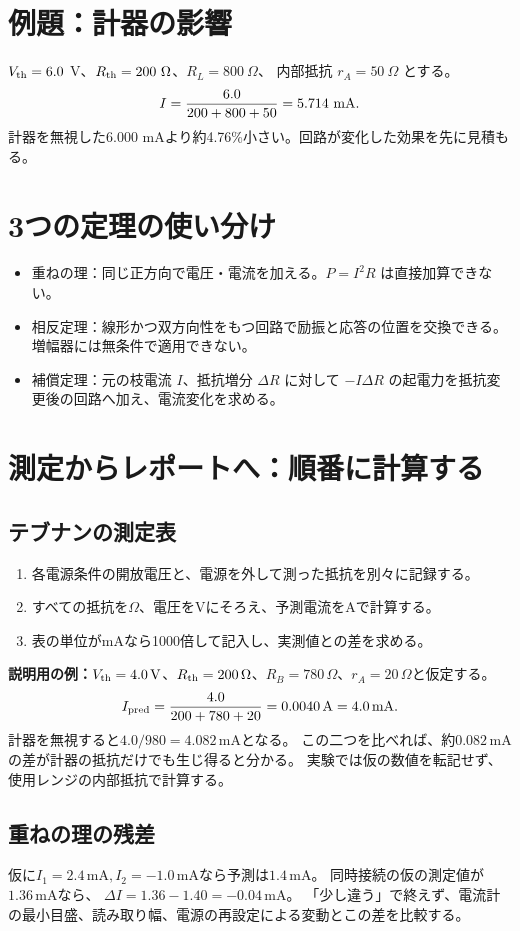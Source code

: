 \documentclass[lualatex,a4paper,10pt]{jlreq}
\begin{document}
\section{例題：計器の影響}\label{sec:auto5}
$V_{\rm th}=6.0$ V、$R_{\rm th}=200\ \Omega$、$R_L=800\ \Omega$、
内部抵抗 $r_A=50\ \Omega$ とする。
\[
I=\frac{6.0}{200+800+50}=5.714\ {\rm mA}.
\]
計器を無視した6.000 mAより約4.76\%小さい。回路が変化した効果を先に見積もる。
\clearpage
\section{3つの定理の使い分け}\label{sec:auto6}
\begin{itemize}
\item 重ねの理：同じ正方向で電圧・電流を加える。$P=I^2R$ は直接加算できない。
\item 相反定理：線形かつ双方向性をもつ回路で励振と応答の位置を交換できる。増幅器には無条件で適用できない。
\item 補償定理：元の枝電流 $I$、抵抗増分 $\Delta R$ に対して $-I\Delta R$ の起電力を抵抗変更後の回路へ加え、電流変化を求める。
\end{itemize}
\section{測定からレポートへ：順番に計算する}\label{sec:auto7}
\subsection{テブナンの測定表}
\begin{enumerate}
\item 各電源条件の開放電圧と、電源を外して測った抵抗を別々に記録する。
\item すべての抵抗を$\Omega$、電圧をVにそろえ、予測電流をAで計算する。
\item 表の単位がmAなら1000倍して記入し、実測値との差を求める。
\end{enumerate}
\textbf{説明用の例：}$V_{\rm th}=4.0\,\mathrm{V}$、$R_{\rm th}=200\,\Omega$、$R_B=780\,\Omega$、$r_A=20\,\Omega$と仮定する。
\[
 I_{\rm pred}=\frac{4.0}{200+780+20}=0.0040\,\mathrm{A}=4.0\,\mathrm{mA}.
\]
計器を無視すると$4.0/980=4.082\,\mathrm{mA}$となる。
この二つを比べれば、約$0.082\,\mathrm{mA}$の差が計器の抵抗だけでも生じ得ると分かる。
実験では仮の数値を転記せず、使用レンジの内部抵抗で計算する。
\subsection{重ねの理の残差}
仮に$I_1=2.4\,\mathrm{mA},I_2=-1.0\,\mathrm{mA}$なら予測は$1.4\,\mathrm{mA}$。
同時接続の仮の測定値が$1.36\,\mathrm{mA}$なら、
$\Delta I=1.36-1.40=-0.04\,\mathrm{mA}$。
「少し違う」で終えず、電流計の最小目盛、読み取り幅、電源の再設定による変動とこの差を比較する。
\end{document}
